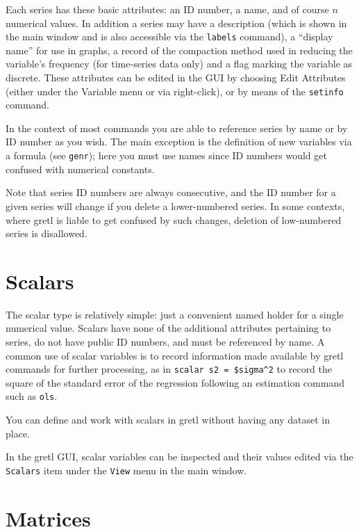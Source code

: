 Each series has these basic attributes: an ID number, a name, and of
course $n$ numerical values. In addition a series may have a
description (which is shown in the main window and is also accessible
via the \texttt{labels} command), a ``display name'' for use in
graphs, a record of the compaction method used in reducing the
variable's frequency (for time-series data only) and a flag marking
the variable as discrete. These attributes can be edited in the GUI by
choosing \textsf{Edit Attributes} (either under the \textsf{Variable}
menu or via right-click), or by means of the \texttt{setinfo} command.

In the context of most commands you are able to reference series by
name or by ID number as you wish. The main exception is the definition
of new variables via a formula (see \texttt{genr}); here you must use
names since ID numbers would get confused with numerical constants.

Note that series ID numbers are always consecutive, and the ID number
for a given series will change if you delete a lower-numbered series.
In some contexts, where gretl is liable to get confused by such
changes, deletion of low-numbered series is disallowed.  

\section{Scalars}
\label{sec:Scalars}

The scalar type is relatively simple: just a convenient named holder
for a single numerical value. Scalars have none of the additional
attributes pertaining to series, do not have public ID numbers, and
must be referenced by name. A common use of scalar variables is to
record information made available by gretl commands for further
processing, as in \texttt{scalar s2 = \$sigma\^{}2} to record the square of
the standard error of the regression following an estimation command
such as \texttt{ols}.

You can define and work with scalars in gretl without having any
dataset in place.

In the gretl GUI, scalar variables can be inspected and their values
edited via the \texttt{Scalars} item under the \texttt{View} menu in
the main window.

\section{Matrices}
\label{sec:Matrices}

